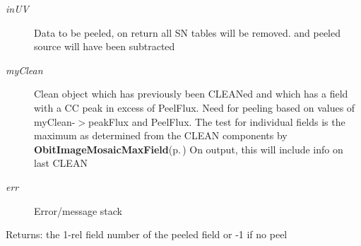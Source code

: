 \begin{Desc}
\begin{description}
\item[{\em in\-UV}]Data to be peeled, on return all SN tables will be removed. and peeled source will have been subtracted \item[{\em my\-Clean}]Clean object which has previously been CLEANed and which has a field with a CC peak in excess of Peel\-Flux. Need for peeling based on values of my\-Clean-$>$peak\-Flux and Peel\-Flux. The test for individual fields is the maximum as determined from the CLEAN components by {\bf Obit\-Image\-Mosaic\-Max\-Field}{\rm (p.\,\pageref{ObitImageMosaic_8c_a30})} On output, this will include info on last CLEAN \item[{\em err}]Error/message stack \end{description}
\end{Desc}
\begin{Desc}
\item[Returns:]the 1-rel field number of the peeled field or -1 if no peel \end{Desc}
